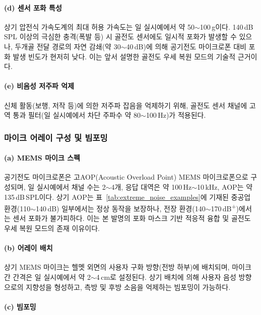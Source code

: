 \documentclass{article}
\begin{document}
\paragraph{(d) 센서 포화 특성}

상기 압전식 가속도계의 최대 허용 가속도는 일 실시예에서 약 50$\sim$100\,g이다. 140\,dB\,SPL 이상의 극심한 충격(폭발 등) 시 골전도 센서에도 일시적 포화가 발생할 수 있으나, 두개골 전달 경로의 자연 감쇄(약 30$\sim$40\,dB)에 의해 공기전도 마이크로폰 대비 포화 발생 빈도가 현저히 낮다. 이는 앞서 설명한 골전도 우세 복원 모드의 기술적 근거이다.

\paragraph{(e) 비음성 저주파 억제}

신체 활동(보행, 저작 등)에 의한 저주파 잡음을 억제하기 위해, 골전도 센서 채널에 고역 통과 필터(일 실시예에서 차단 주파수 약 80$\sim$100\,Hz)가 적용된다.

\subsubsection{마이크 어레이 구성 및 빔포밍}

\paragraph{(a) MEMS 마이크 스펙}

공기전도 마이크로폰은 고AOP(Acoustic Overload Point) MEMS 마이크로폰으로 구성되며, 일 실시예에서 채널 수는 2$\sim$4개, 응답 대역은 약 100\,Hz$\sim$10\,kHz, AOP는 약 135\,dB\,SPL이다. 상기 AOP는 표~\ref{tab:extreme_noise_examples}에 기재된 중공업 환경(110$\sim$140\,dB) 일부에서는 정상 동작을 보장하나, 전장 환경(140$\sim$170\,dB\textsuperscript{+})에서는 센서 포화가 불가피하다. 이는 본 발명의 포화 마스크 기반 적응적 융합 및 골전도 우세 복원 모드의 존재 이유이다.

\paragraph{(b) 어레이 배치}

상기 MEMS 마이크는 헬멧 외면의 사용자 구화 방향(전방 하부)에 배치되며, 마이크 간 간격은 일 실시예에서 약 2$\sim$4\,cm로 설정된다. 상기 배치에 의해 사용자 음성 방향으로의 지향성을 형성하고, 측방 및 후방 소음을 억제하는 빔포밍이 가능하다.

\paragraph{(c) 빔포밍}
\end{document}
